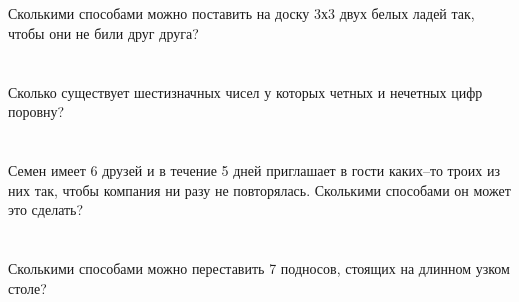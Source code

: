 \documentclass{article}%
\begin{document}
%
\section{}%
\label{sec:}%
Сколькими способами можно поставить на доску 3х3 двух белых ладей так, чтобы они не били друг друга?%
%
\iffalse%
Автор: Ираклий Гагуа%
Дата: 07{-}01{-}2011%
Название: None%
Подсказка: \textbackslash{}\textbackslash{}%
nan%
\fi

%
\section{}%
\label{sec:}%
Сколько существует шестизначных чисел у которых четных и нечетных цифр
поровну?%
%
\iffalse%
Автор: 25 школа%
Дата: 01{-}07{-}2017%
Название: None%
Подсказка: \textbackslash{}\textbackslash{}%
nan%
\fi

%
\section{}%
\label{sec:}%
Семен имеет 6 друзей и в течение 5 дней приглашает в гости каких–то троих
из них так, чтобы компания ни разу не повторялась. Сколькими способами он может
это сделать?%
%
\iffalse%
Автор: 25 школа%
Дата: 01{-}07{-}2017%
Название: None%
Подсказка: \textbackslash{}\textbackslash{}%
nan%
\fi

%
\section{}%
\label{sec:}%
Сколькими способами можно переставить 7 подносов, стоящих на длинном узком столе?%
%
\iffalse%
Автор: Ираклий Гагуа%
Дата: 07{-}01{-}2011%
Название: None%
Подсказка: \textbackslash{}\textbackslash{}%
nan%
\fi

%
\end{document}
